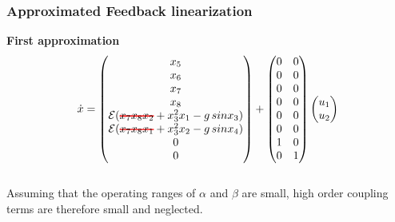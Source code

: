 \begin{frame}
\frametitle{Approximated Feedback linearization}
\textbf{First approximation}
\begin{equation}\label{eq:simplified_dynamic}
\dot{x} =%
	\begin{pmatrix}
	x_5\\
	x_6\\
	x_7\\
	x_8\\
	\mathcal{E}(\hcancel[red]{x_7x_8x_2} + x^2_3x_1 - g\,sinx_3)\\
	\mathcal{E}(\hcancel[red]{x_7x_8x_1} + x^2_3x_2 - g\,sinx_4)\\
	0\\
	0\\
	\end{pmatrix}
	+
	\begin{pmatrix}
		0 &0\\
		0 &0\\
		0 &0\\
		0 &0\\
		0 &0\\
		0 &0\\
		1 &0\\
		0 &1\\
	\end{pmatrix}
	\begin{pmatrix}
		u_1\\
	 	u_2
	\end{pmatrix}
\end{equation}\\[10pt]
Assuming that the operating ranges of $\alpha$ and $\beta$ are small, high order coupling terms are therefore small and neglected.
\end{frame}
%
